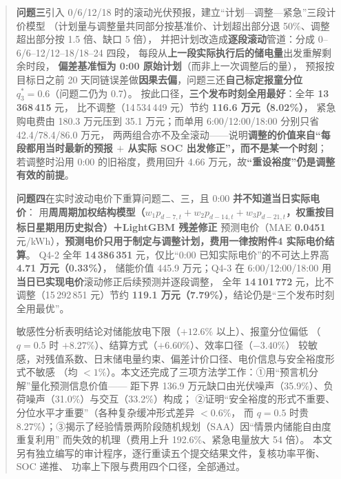 \documentclass[withoutpreface,bwprint]{cumcmthesis}
\begin{document}
\begin{abstract}
\textbf{问题三}引入 0/6/12/18 时的滚动光伏预报\nobreak，建立“计划—调整—紧急\nobreak”三段计价模型
（计划量与调整量共同部分按基准价\nobreak、计划超出部分退 50\%\nobreak、调整超出部分按 1.5 倍\nobreak、缺口 5 倍\nobreak）\nobreak，
并把计划改造成\textbf{逐段滚动}管道\nobreak：分成 0--6/6--12/12--18/18--24 四段\nobreak，
每段从\textbf{上一段实际执行后的储电量}出发重解剩余时段\nobreak，
\textbf{偏差基准恒为 0:00 原始计划}（而非上一次调整后的量\nobreak）\nobreak，
预报按目标日之前 20 天同链误差做\textbf{因果去偏}\nobreak，问题三还\textbf{自己标定报童分位 $q_3^*=0.6$}（问题二仍为 0.7\nobreak）\nobreak。
按此口径\nobreak，\textbf{三个发布时刻全用最好}\nobreak：全年 \textbf{13\,368\,415} 元\nobreak，
比不调整（14\,534\,449 元\nobreak）节约 \textbf{116.6 万元（8.02\%\nobreak）}\nobreak，
紧急购电费由 180.3 万元压到 35.1 万元\nobreak；而单用 6:00/12:00/18:00 分别只省 42.4/78.4/86.0 万元\nobreak，
两两组合亦不及全滚动——说明\textbf{调整的价值来自“每段都用当时最新的预报 $+$ 从实际 SOC 出发修正\nobreak”，而不是某一个时刻}\nobreak；
若调整时沿用 0:00 的旧裕度\nobreak，费用回升 4.66 万元\nobreak，故\textbf{“重设裕度\nobreak”仍是调整有效的前提}\nobreak。

\textbf{问题四}在实时波动电价下重算问题二\nobreak、三\nobreak，且 0:00 \textbf{并不知道当日实际电价}：
用\textbf{周周期加权结构模型（$w_1p_{d-7,t}+w_2p_{d-14,t}+w_3p_{d-21,t}$，权重按目标日星期用历史拟合）＋LightGBM 残差修正}
预测电价（MAE \textbf{0.0451} 元/kWh\nobreak），\textbf{预测电价只用于制定与调整计划\nobreak，费用一律按附件4 实际电价结算}\nobreak。
Q4-2 全年 \textbf{14\,386\,351} 元\nobreak，仅比“0:00 已知实际电价\nobreak”的不可达上界高 \textbf{4.71 万元（0.33\%\nobreak）}\nobreak，
储能价值 445.9 万元\nobreak；Q4-3 在 6:00/12:00/18:00 用\textbf{当日已实现电价}滚动修正后续预测并逐段调整\nobreak，
全年 \textbf{14\,101\,772} 元\nobreak，比不调整（15\,292\,851 元\nobreak）节约 \textbf{119.1 万元（7.79\%\nobreak）}\nobreak，结论仍是“三个发布时刻全用最优\nobreak”\nobreak。

敏感性分析表明结论对储能放电下限（$+12.6\text{\%}$ 以上\nobreak）\nobreak、报童分位偏低
（$q=0.5$ 时 $+8.27\text{\%}$\nobreak）\nobreak、结算方式（$+6.60\text{\%}$\nobreak）\nobreak、效率口径（$-3.40\text{\%}$\nobreak）
较敏感\nobreak，对残值系数\nobreak、日末储电量约束\nobreak、偏差计价口径\nobreak、电价信息与安全裕度形式不敏感
（均 $<1\text{\%}$\nobreak）\nobreak。本文还完成了三项方法学工作\nobreak：①用“预言机分解\nobreak”量化预测信息价值——
距下界 136.9 万元缺口由光伏噪声（35.9\%\nobreak）\nobreak、负荷噪声（31.0\%\nobreak）与交互（33.2\%\nobreak）构成\nobreak；
②证明“安全裕度的形式不重要\nobreak、分位水平才重要\nobreak”（各种复杂缓冲形式差异 $<0.6\text{\%}$\nobreak，
而 $q=0.5$ 时贵 8.27\%\nobreak）\nobreak；③揭示了经验情景两阶段随机规划（SAA\nobreak）因“情景内储能自由度重复利用\nobreak”
而失效的机理（费用上升 192.6\%\nobreak、紧急电量放大 54 倍\nobreak）\nobreak。
本文另有独立编写的审计程序\nobreak，逐行重读五个提交结果文件\nobreak，复核功率平衡\nobreak、SOC 递推\nobreak、
功率上下限与费用四个口径\nobreak，全部通过\nobreak。

\end{abstract}
\end{document}
